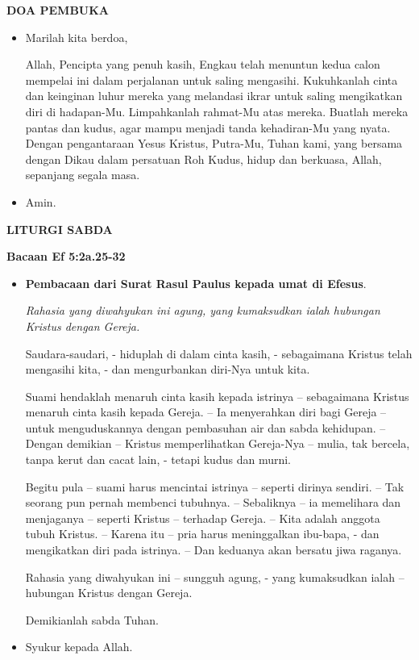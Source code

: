\documentclass[a5paper,titlepage,11pt,openany]{scrbook}
\makeatletter
\newcommand{\judul}[1]{%
  {\parindent \z@ \centering 
    \interlinepenalty\@M \Large \bfseries #1\par\nobreak \vskip 20\p@ }}
\newcommand{\subjudul}[1]{%
  {\parindent \z@ 
    \interlinepenalty\@M \large \bfseries #1\par\nobreak \vskip 10\p@ }}
\newcommand{\subsubjudul}[1]{%
  {\parindent \z@ 
    \interlinepenalty\@M \bfseries #1\par\nobreak \vskip 10\p@ }}
\newcommand{\BU}[1]{\begin{itemize} \item[U:] #1 \end{itemize}}
\newcommand{\BI}[1]{\begin{itemize} \item[I:] #1 \end{itemize}}
\newcommand{\BP}[1]{\begin{itemize} \item[P:] #1 \end{itemize}}
\makeatother
\begin{document}


\subjudul{DOA PEMBUKA}

\BI{Marilah kita berdoa,

Allah, Pencipta yang penuh kasih, Engkau telah menuntun kedua calon mempelai ini dalam perjalanan untuk saling mengasihi. Kukuhkanlah cinta dan keinginan luhur mereka yang melandasi ikrar untuk saling mengikatkan diri di hadapan-Mu. Limpahkanlah rahmat-Mu atas mereka. Buatlah mereka pantas dan kudus, agar mampu menjadi tanda kehadiran-Mu yang nyata. Dengan pengantaraan Yesus Kristus, Putra-Mu, Tuhan kami, yang bersama dengan Dikau dalam persatuan Roh Kudus, hidup dan berkuasa, Allah, sepanjang segala masa.}

\BU{Amin.}



\judul{LITURGI SABDA}


\subsubjudul{Bacaan  Ef 5:2a.25-32}
                                                                                    
\BP{\textbf{Pembacaan dari Surat Rasul Paulus kepada umat di Efesus}.
      
   \textit{Rahasia yang diwahyukan ini agung, yang kumaksudkan ialah hubungan Kristus dengan Gereja.}

         Saudara-saudari, - hiduplah di dalam cinta kasih, - sebagaimana Kristus telah mengasihi kita, - dan mengurbankan diri-Nya untuk kita.

         Suami hendaklah menaruh cinta kasih kepada istrinya – sebagaimana Kristus menaruh cinta kasih kepada Gereja. – Ia menyerahkan diri bagi Gereja – untuk menguduskannya dengan pembasuhan air dan sabda kehidupan. – Dengan demikian – Kristus memperlihatkan Gereja-Nya – mulia, tak bercela, tanpa kerut dan cacat lain, - tetapi kudus dan murni.

         Begitu pula – suami harus mencintai istrinya – seperti dirinya sendiri. – Tak seorang pun pernah membenci tubuhnya. – Sebaliknya – ia memelihara dan menjaganya – seperti Kristus – terhadap Gereja. – Kita adalah anggota tubuh Kristus. – Karena itu – pria harus meninggalkan ibu-bapa, - dan mengikatkan diri pada istrinya. – Dan keduanya akan bersatu jiwa raganya.

         Rahasia yang diwahyukan ini – sungguh agung, - yang kumaksudkan ialah – hubungan Kristus dengan Gereja.

Demikianlah sabda Tuhan.}

\BU{ Syukur kepada Allah.}
\end{document}
